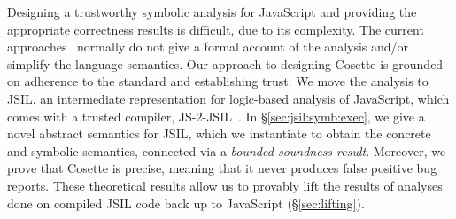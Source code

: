 \documentclass[sigconf, anonymous, review]{acmart}
\newcommand{\jsil}{JSIL\xspace}
\newcommand{\JSComp}{JS-2-JSIL\xspace}
\newcommand{\cosette}{Cosette\xspace}
\newcommand{\myparagraph}[1]{\smallskip\noindent {\bf #1.}\hspace{1pt}}
\begin{document}

 
\myparagraph{Trustworthiness} Designing a trustworthy symbolic analysis for JavaScript and providing the appropriate correctness results is difficult, due to its complexity. The current approaches~\cite{.} normally do not give a formal account of the analysis and/or simplify the language semantics. Our approach to designing \cosette is grounded on adherence to the standard and establishing trust. 
We move the analysis to \jsil, an intermediate representation for logic-based analysis of JavaScript, which comes with a trusted compiler, \JSComp~\cite{javert}.
In \S\ref{sec:jsil:symb:exec}, we give a novel abstract semantics for \jsil, which we instantiate to obtain the concrete and symbolic semantics, connected via a {\em bounded soundness result}. Moreover, we prove that \cosette is precise, meaning that it never produces false positive bug reports. 
These theoretical results %
allow us to  provably lift the results of analyses done on compiled \jsil code back up to JavaScript (\S\ref{sec:lifting}). %
\end{document}
